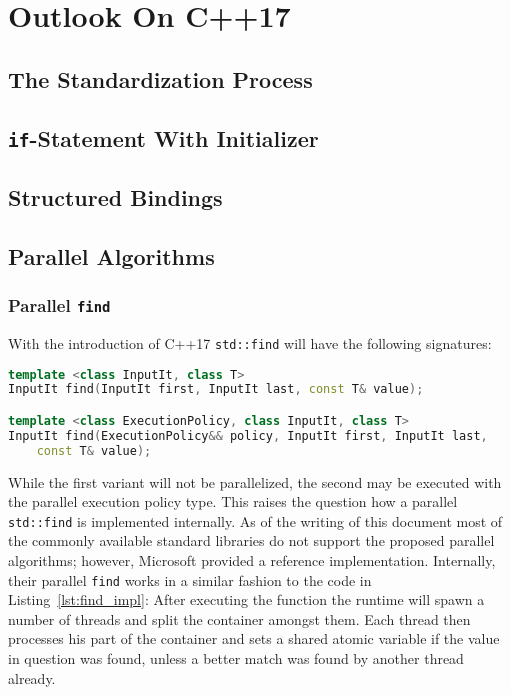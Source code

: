 \section{Outlook On C++17}

\subsection{The Standardization Process}

\subsection{\texttt{if}-Statement With Initializer}
\subsection{Structured Bindings}
\subsection{Parallel Algorithms}

\subsubsection{Parallel \texttt{find}}

With the introduction of C++17 \texttt{std::find} will have the following signatures:

\begin{lstlisting}[language=C++]
template <class InputIt, class T>
InputIt find(InputIt first, InputIt last, const T& value);

template <class ExecutionPolicy, class InputIt, class T>
InputIt find(ExecutionPolicy&& policy, InputIt first, InputIt last,
    const T& value);
\end{lstlisting}

While the first variant will not be parallelized, the second may be executed with the parallel execution policy type. This raises the question how a parallel \texttt{std::find} is implemented internally. As of the writing of this document most of the commonly available standard libraries do not support the proposed parallel algorithms; however, Microsoft provided a reference implementation. Internally, their parallel \texttt{find} works in a similar fashion to the code in Listing~\ref{lst:find_impl}: After executing the function the runtime will spawn a number of threads and split the container amongst them. Each thread then processes his part of the container and sets a shared atomic variable if the value in question was found, unless a better match was found by another thread already.

